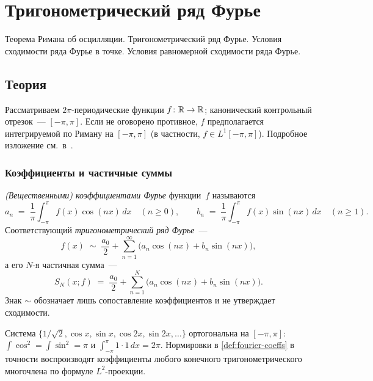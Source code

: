 
\section{Тригонометрический ряд Фурье}
\label{sec:1.1.12-fourier-series}

\begin{ticket}
Теорема Римана об осцилляции. Тригонометрический ряд Фурье. Условия сходимости ряда Фурье в точке. Условия равномерной сходимости ряда Фурье.
\end{ticket}

\subsection*{Теория}

Рассматриваем $2\pi$-периодические функции $f \colon \mathbb{R} \to \mathbb{R}$;
канонический контрольный отрезок~--- $[-\pi, \pi]$. Если не оговорено
противное, $f$ предполагается интегрируемой по Риману на $[-\pi, \pi]$
(в частности, $f \in L^1[-\pi, \pi]$). Подробное изложение
см.\ в~\cite[Т.~II, гл.~XVIII]{Zorich1981}.

\subsubsection*{Коэффициенты и частичные суммы}

\begin{definition}
\label{def:fourier-coeffs}
\emph{(Вещественными) коэффициентами Фурье} функции~$f$ называются
\[
  a_n \;=\; \frac{1}{\pi} \int_{-\pi}^{\pi} f(x) \cos(nx)\, dx \quad (n \ge 0),
  \qquad
  b_n \;=\; \frac{1}{\pi} \int_{-\pi}^{\pi} f(x) \sin(nx)\, dx \quad (n \ge 1).
\]
Соответствующий \emph{тригонометрический ряд Фурье}~---
\[
  f(x) \;\sim\; \frac{a_0}{2} + \sum_{n=1}^{\infty} \bigl(a_n \cos(nx) + b_n \sin(nx)\bigr),
\]
а его $N$-я частичная сумма~---
\[
  S_N(x; f) \;=\; \frac{a_0}{2} + \sum_{n=1}^{N} \bigl(a_n \cos(nx) + b_n \sin(nx)\bigr).
\]
Знак $\sim$ обозначает лишь сопоставление коэффициентов и не
утверждает сходимости.
\end{definition}

\begin{remark}
Система $\bigl\{1/\sqrt{2}, \cos x, \sin x, \cos 2x, \sin 2x, \dots\bigr\}$
ортогональна на $[-\pi, \pi]$: $\int \cos^2 = \int \sin^2 = \pi$ и
$\int_{-\pi}^{\pi} 1 \cdot 1\, dx = 2\pi$. Нормировки в
\cref{def:fourier-coeffs} в точности воспроизводят коэффициенты любого
конечного тригонометрического многочлена по формуле $L^2$-проекции.
\end{remark}

